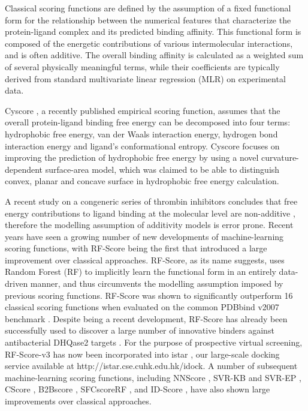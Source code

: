 \documentclass[twocolumn]{bmcart}
\begin{document}
Classical scoring functions are defined by the assumption of a fixed functional form for the relationship between the numerical features that characterize the protein-ligand complex and its predicted binding affinity. This functional form is composed of the energetic contributions of various intermolecular interactions, and is often additive. The overall binding affinity is calculated as a weighted sum of several physically meaningful terms, while their coefficients are typically derived from standard multivariate linear regression (MLR) on experimental data.

Cyscore \cite{1372}, a recently published empirical scoring function, assumes that the overall protein-ligand binding free energy can be decomposed into four terms: hydrophobic free energy, van der Waals interaction energy, hydrogen bond interaction energy and ligand's conformational entropy. Cyscore focuses on improving the prediction of hydrophobic free energy by using a novel curvature-dependent surface-area model, which was claimed to be able to distinguish convex, planar and concave surface in hydrophobic free energy calculation.

A recent study on a congeneric series of thrombin inhibitors concludes that free energy contributions to ligand binding at the molecular level are non-additive \cite{1416}, therefore the modelling assumption of additivity models is error prone. Recent years have seen a growing number of new developments of machine-learning scoring functions, with RF-Score \cite{564} being the first that introduced a large improvement over classical approaches. RF-Score, as its name suggests, uses Random Forest (RF) \cite{1309} to implicitly learn the functional form in an entirely data-driven manner, and thus circumvents the modelling assumption imposed by previous scoring functions. RF-Score was shown to significantly outperform 16 classical scoring functions when evaluated on the common PDBbind v2007 benchmark \cite{564}. Despite being a recent development, RF-Score has already been successfully used to discover a large number of innovative binders against antibacterial DHQase2 targets \cite{1281}. For the purpose of prospective virtual screening, RF-Score-v3 has now been incorporated into istar \cite{1362}, our large-scale docking service available at http://istar.cse.cuhk.edu.hk/idock. A number of subsequent machine-learning scoring functions, including NNScore \cite{977}, SVR-KB and SVR-EP \cite{963}, CScore \cite{1194}, B2Bscore \cite{1410}, SFCscoreRF \cite{1347}, and ID-Score \cite{1305}, have also shown large improvements over classical approaches.
\end{document}
